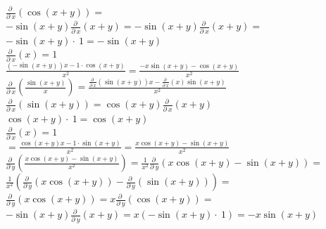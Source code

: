 \documentclass[14pt]{memoir}
\begin{document}
\begin{enumerate}
$\frac{\partial \:}{\partial \:x}\left(\cos \left(x+y\right)\right) =$ \\
$-\sin \left(x+y\right)\frac{\partial \:}{\partial \:x}\left(x+y\right) = -\sin \left(x+y\right)\frac{\partial \:}{\partial \:x}\left(x+y\right)=$\\
$-\sin \left(x+y\right)\cdot \:1 = -\sin \left(x+y\right)$ \\
$\frac{\partial \:}{\partial \:x}\left(x\right) = 1$\\

$\frac{\left(-\sin \left(x+y\right)\right)x-1\cdot \cos \left(x+y\right)}{x^2} = \frac{-x\sin \left(x+y\right)-\cos \left(x+y\right)}{x^2}$\\

$\frac{\partial \:}{\partial \:x}\left(\frac{\sin \left(x+y\right)}{x}\right) = \frac{\frac{\partial \:}{\partial \:x}\left(\sin \left(x+y\right)\right)x-\frac{\partial \:}{\partial \:x}\left(x\right)\sin \left(x+y\right)}{x^2}$\\

$\frac{\partial \:}{\partial \:x}\left(\sin \left(x+y\right)\right) = \cos \left(x+y\right)\frac{\partial \:}{\partial \:x}\left(x+y\right)$\\
$\cos \left(x+y\right)\cdot \:1 = \cos \left(x+y\right)$\\

$\frac{\partial \:}{\partial \:x}\left(x\right)=1$\\

$=\frac{\cos \left(x+y\right)x-1\cdot \sin \left(x+y\right)}{x^2} = \frac{x\cos \left(x+y\right)-\sin \left(x+y\right)}{x^2}$ \\

$\frac{\partial \:}{\partial \:y}\left(\frac{x\cos \left(x+y\right)-\sin \left(x+y\right)}{x^2}\right) = \frac{1}{x^2}\frac{\partial \:}{\partial \:y}\left(x\cos \left(x+y\right)-\sin \left(x+y\right)\right) =$  \\
$\frac{1}{x^2}\left(\frac{\partial \:}{\partial \:y}\left(x\cos \left(x+y\right)\right)-\frac{\partial \:}{\partial \:y}\left(\sin \left(x+y\right)\right)\right)=$\\

$\frac{\partial \:}{\partial \:y}\left(x\cos \left(x+y\right)\right) = x\frac{\partial \:}{\partial \:y}\left(\cos \left(x+y\right)\right) =$ \\
$-\sin \left(x+y\right)\frac{\partial \:}{\partial \:y}\left(x+y\right) =x\left(-\sin \left(x+y\right)\cdot \:1\right) = -x\sin \left(x+y\right) $ \\


\end{enumerate}
\end{document}

